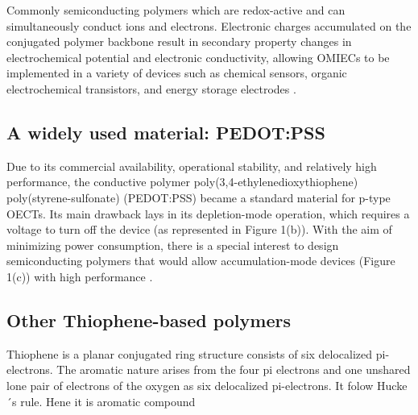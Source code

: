 \cite{paulsenOrganicMixedIonic2020}

Commonly semiconducting polymers which are redox-active and can simultaneously conduct ions and electrons. Electronic charges accumulated on the conjugated polymer backbone result in secondary property changes in electrochemical potential and electronic conductivity, allowing OMIECs to be implemented in a variety of devices such as chemical sensors, organic electrochemical transistors, and energy storage electrodes \cite{tanOrganicMixedIonic2022}.

\subsection{A widely used material: PEDOT:PSS}
Due to its commercial availability, operational stability, and relatively high performance, the conductive polymer poly(3,4-ethylenedioxythiophene) poly(styrene-sulfonate) (PEDOT:PSS) became a standard material for p-type OECTs. Its main drawback lays in its depletion-mode operation, which requires a voltage to turn off the device (as represented in Figure 1(b)). With the aim of minimizing power consumption, there is a special interest to design semiconducting polymers that would allow accumulation-mode devices (Figure 1(c)) with high performance \cite{nielsenMolecularDesignSemiconducting2016} \cite{tanOrganicMixedIonic2022}.

\subsection{Other Thiophene-based polymers}
Thiophene is a planar conjugated ring structure consists of six delocalized pi-electrons. The aromatic nature arises from the four pi electrons and one unshared lone pair of electrons of the oxygen as six delocalized pi-electrons. It folow Hucke´s rule. Hene it is aromatic compound

